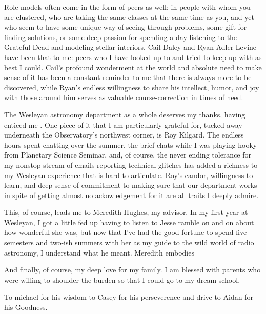 Role models often come in the form of peers as well; in people with whom you are clustered, who are taking the same classes at the same time as you, and yet who seem to have some unique way of seeing through problems, some gift for finding solutions, or some deep passion for spending a day listening to the Grateful Dead and modeling stellar interiors. Cail Daley and Ryan Adler-Levine have been that to me: peers who I have looked up to and tried to keep up with as best I could. Cail's profound wonderment at the world and absolute need to make sense of it has been a constant reminder to me that there is always more to be discovered, while Ryan's endless willingness to share his intellect, humor, and joy with those around him serves as valuable course-correction in times of need.




The Wesleyan astronomy department as a whole deserves my thanks, having enticed me . One piece of it that I am particularly grateful for, tucked away underneath the Observatory's northwest corner, is Roy Kilgard. The endless hours spent chatting over the summer, the brief chats while I was playing hooky from Planetary Science Seminar, and, of course, the never ending tolerance for my nonstop stream of emails reporting technical glitches has added a richness to my Wesleyan experience that is hard to articulate. Roy's candor, willingness to learn, and deep sense of commitment to making sure that our department works in spite of getting almost no ackowledgement for it are all traits I deeply admire.



This, of course, leads me to Meredith Hughes, my advisor. In my first year at Wesleyan, I got a little fed up having to listen to Jesse ramble on and on about how wonderful she was, but now that I've had the good fortune to spend five semesters and two-ish summers with her as my guide to the wild world of radio astronomy, I understand what he meant. Meredith embodies



And finally, of course, my deep love for my family. I am blessed with parents who were willing to shoulder the burden so that I could go to my dream school.

To michael for his wisdom
to Casey for his perseverence and drive
to Aidan for his Goodness.





